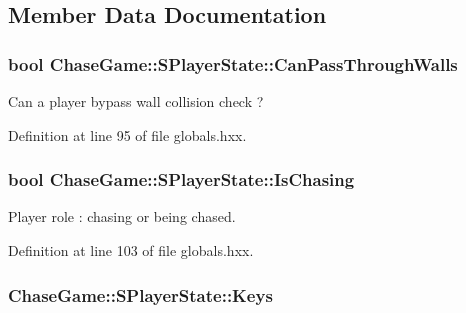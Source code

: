 \subsection{Member Data Documentation}
\hypertarget{struct_chase_game_1_1_s_player_state_acd7030969c414605901e551171078bb1}{
\subsubsection[{Can\-Pass\-Through\-Walls}]{\setlength{\rightskip}{0pt plus 5cm}bool Chase\-Game\-::\-S\-Player\-State\-::\-Can\-Pass\-Through\-Walls}}\label{struct_chase_game_1_1_s_player_state_acd7030969c414605901e551171078bb1}


Can a player bypass wall collision check ? 



Definition at line 95 of file globals.\-hxx.

\hypertarget{struct_chase_game_1_1_s_player_state_a2574de666d4744daefd7824b1c3c809f}{
\subsubsection[{Is\-Chasing}]{\setlength{\rightskip}{0pt plus 5cm}bool Chase\-Game\-::\-S\-Player\-State\-::\-Is\-Chasing}}\label{struct_chase_game_1_1_s_player_state_a2574de666d4744daefd7824b1c3c809f}


Player role \-: chasing or being chased. 



Definition at line 103 of file globals.\-hxx.

\hypertarget{struct_chase_game_1_1_s_player_state_a3fc9ce0322ed28ff9c401983d91c69f2}{
\subsubsection[{Keys}]{ Chase\-Game\-::\-S\-Player\-State\-::\-Keys}}\label{struct_chase_game_1_1_s_player_state_a3fc9ce0322ed28ff9c401983d91c69f2}


